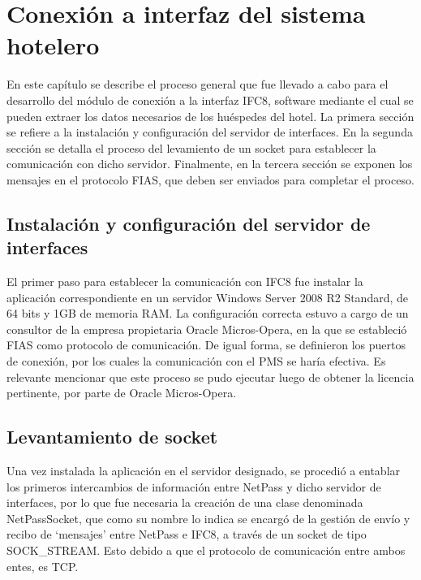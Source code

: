 \chapter{Conexión a interfaz del sistema hotelero}\label{chapter:Conexión a interfaz del sistema hotelero}

		En este capítulo se describe el proceso general que fue llevado a cabo para el desarrollo del módulo de conexión a la interfaz IFC8, software mediante el cual se pueden extraer los datos necesarios de los huéspedes del hotel. La primera sección se refiere a la instalación y configuración del servidor de interfaces. En la segunda sección se detalla el proceso del levamiento de un socket para establecer la comunicación con dicho servidor. Finalmente, en la tercera sección se exponen los mensajes en el protocolo FIAS, que deben ser enviados para completar el proceso.

\section{Instalación y configuración del servidor de interfaces} \label{sect:Instalación y configuración del servidor de interfaces}
	El primer paso para establecer la comunicación con IFC8 fue instalar la aplicación  correspondiente en un servidor Windows Server 2008 R2 Standard, de 64 bits y 1GB de memoria RAM. La configuración correcta estuvo a cargo de un consultor de la empresa propietaria Oracle Micros-Opera, en la que se estableció FIAS como protocolo de comunicación. De igual forma, se definieron los puertos de conexión, por los cuales la comunicación con el PMS se haría efectiva. Es relevante mencionar que este proceso se pudo ejecutar luego de obtener la licencia pertinente, por parte de Oracle Micros-Opera.

\section{Levantamiento de socket}
	Una vez instalada la aplicación en el servidor designado, se procedió a entablar los primeros intercambios de información entre NetPass y dicho servidor de interfaces, por lo que fue necesaria la creación de una clase denominada NetPassSocket, que como su nombre lo indica se encargó de la gestión de envío y recibo de ‘mensajes’ entre NetPass e IFC8, a través de un socket de tipo SOCK_STREAM. Esto debido a que el protocolo de comunicación entre ambos entes, es TCP. 

